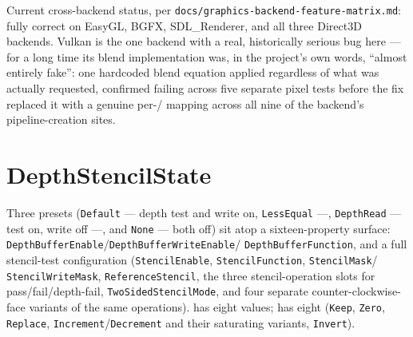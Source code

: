 Current cross-backend status, per \texttt{docs/graphics-backend-feature-matrix.md}: fully
correct on EasyGL, BGFX, SDL\_Renderer, and all three Direct3D backends. Vulkan is the one
backend with a real, historically serious bug here --- for a long time its blend
implementation was, in the project's own words, ``almost entirely fake'': one hardcoded
blend equation applied regardless of what was actually requested, confirmed failing across
five separate pixel tests before the fix replaced it with a genuine per-/%
 mapping across all nine of the backend's pipeline-creation sites.

\section{DepthStencilState}

Three presets (\texttt{Default} --- depth test and write on, \texttt{LessEqual} ---,
\texttt{DepthRead} --- test on, write off ---, and \texttt{None} --- both off) sit atop a
sixteen-property surface: \texttt{DepthBufferEnable}/\texttt{DepthBufferWriteEnable}/%
\texttt{DepthBufferFunction}, and a full stencil-test configuration
(\texttt{StencilEnable}, \texttt{StencilFunction}, \texttt{StencilMask}/%
\texttt{StencilWriteMask}, \texttt{ReferenceStencil}, the three stencil-operation slots for
pass/fail/depth-fail, \texttt{TwoSidedStencilMode}, and four separate counter-clockwise-face
variants of the same operations).  has eight values;
 has eight (\texttt{Keep}, \texttt{Zero}, \texttt{Replace},
\texttt{Increment}/\texttt{Decrement} and their saturating variants, \texttt{Invert}).

